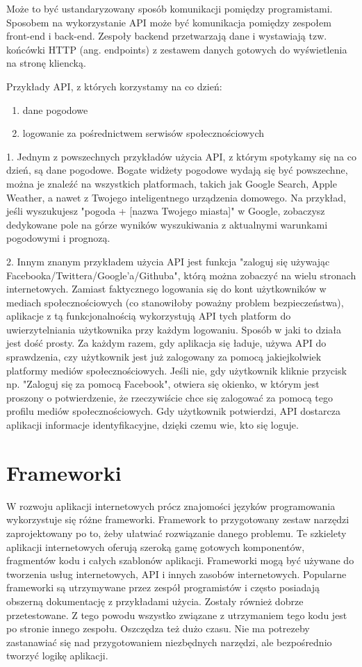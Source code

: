 Może to być ustandaryzowany sposób komunikacji pomiędzy programistami. Sposobem na wykorzystanie API może być komunikacja pomiędzy zespołem front-end i back-end. Zespoły backend przetwarzają dane i wystawiają tzw. końcówki HTTP (ang. endpoints) z zestawem danych gotowych do wyświetlenia na stronę kliencką.

Przykłady API, z których korzystamy na co dzień:
\begin{enumerate}
\item dane pogodowe
\item logowanie za pośrednictwem serwisów społecznościowych
\end{enumerate}




1. Jednym z powszechnych przykładów użycia API, z którym spotykamy się na co dzień, są dane pogodowe. Bogate widżety pogodowe wydają się być powszechne, można je znaleźć na wszystkich platformach, takich jak Google Search, Apple Weather, a nawet z Twojego inteligentnego urządzenia domowego. Na przykład, jeśli wyszukujesz "pogoda + [nazwa Twojego miasta]" w Google, zobaczysz dedykowane pole na górze wyników wyszukiwania z aktualnymi warunkami pogodowymi i prognozą.


2. Innym znanym przykładem użycia API jest funkcja "zaloguj się używając Facebooka/Twittera/Google'a/Githuba", którą można zobaczyć na wielu stronach internetowych. Zamiast faktycznego logowania się do kont użytkowników w mediach społecznościowych (co stanowiłoby poważny problem bezpieczeństwa), aplikacje z tą funkcjonalnością wykorzystują API tych platform do uwierzytelniania użytkownika przy każdym logowaniu. Sposób w jaki to działa jest dość prosty. Za każdym razem, gdy aplikacja się ładuje, używa API do sprawdzenia, czy użytkownik jest już zalogowany za pomocą jakiejkolwiek platformy mediów społecznościowych. Jeśli nie, gdy użytkownik kliknie przycisk np. "Zaloguj się za pomocą Facebook", otwiera się okienko, w którym jest proszony o potwierdzenie, że rzeczywiście chce się zalogować za pomocą tego profilu mediów społecznościowych. Gdy użytkownik potwierdzi, API dostarcza aplikacji informacje identyfikacyjne, dzięki czemu wie, kto się loguje.

\section{Frameworki}
W rozwoju aplikacji internetowych prócz znajomości języków programowania wykorzystuje się różne frameworki. Framework to przygotowany zestaw narzędzi zaprojektowany po to, żeby ułatwiać rozwiązanie danego problemu. Te szkielety aplikacji internetowych oferują szeroką gamę gotowych komponentów, fragmentów kodu i całych szablonów aplikacji. Frameworki mogą być używane do tworzenia usług internetowych, API i innych zasobów internetowych. 
Popularne frameworki są utrzymywane przez zespół programistów i często posiadają obszerną dokumentację z przykładami użycia. Zostały również dobrze przetestowane. Z tego powodu wszystko związane z utrzymaniem tego kodu jest po stronie innego zespołu. Oszczędza też dużo czasu. Nie ma potrezeby zastanawiać się nad przygotowaniem niezbędnych narzędzi, ale bezpośrednio tworzyć logikę aplikacji.

